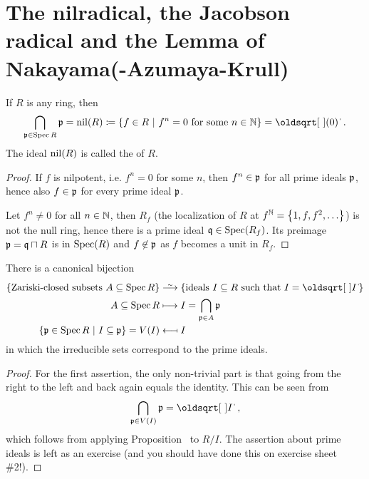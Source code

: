 \documentclass[a4paper,parskip=half,numbers=enddot, DIV=12]{scrreprt}
\begin{document}
\section{The nilradical, the Jacobson radical and the Lemma of Nakayama(-Azumaya-Krull)}

\begin{prop}
    If $R$ is any ring, then 
    \begin{align*}
    	\bigcap_{\pp\in\Spec R} \pp =\nil(R) \coloneqq \left\{f\in R\st f^n=0 \text{ for some } n\in\IN\right\} = \sqrt{(0)}\;.
    \end{align*}
    The ideal $\operatorname{nil}(R)$ is called the  of $R$.
\end{prop}
\begin{proof}
    If $f$ is nilpotent, i.e. $f^n=0$ for some $n$, then $f^n\in\mathfrak{p}$ for all prime ideals $\mathfrak{p}$, hence also $f\in\mathfrak{p}$ for every prime ideal $\mathfrak{p}$. 
    
    Let $f^n\neq 0$ for all $n\in \mathbb{N}$, then $R_f$ (the localization of $R$ at $f^{\mathbb{N}}=\left\{1,f,f^2,\ldots\right\}$) is not the null ring, hence there is a prime ideal $\mathfrak{q}\in\operatorname{Spec}(R_f)$. Its preimage $\mathfrak{p}=\mathfrak{q}\sqcap R$ is in $\operatorname{Spec}(R)$ and $f\not \in\mathfrak{p}$ as $f$ becomes a unit in $R_f$.
\end{proof}
\begin{cor}
    There is a canonical bijection 
    \begin{align*}
	    \left\{\text{Zariski-closed subsets }A\subseteq \Spec R\right\}&\isomorphism \left\{\text{ideals }I\subseteq R\text{ such that }I=\sqrt{I}\right\}\\
        A \subseteq \Spec R &\longmapsto I = \bigcap_{\pp\in A} \pp\\
        \left\{\pp\in \Spec R\st I\subseteq \pp\right\}=V(I)&\longmapsfrom I
    \end{align*}
    in which the irreducible sets correspond to the prime ideals.
\end{cor}
\begin{proof}
    For the first assertion, the only non-trivial part is that going from the right to the left and back again equals the identity. This can be seen from 
    \begin{align}\lbl{eq:PrimeCapRadical}
        \bigcap_{\pp\in V(I)}\pp = \sqrt{I}\;,
    \end{align}
    which follows from applying Proposition~ to $R/I$. The assertion about prime ideals is left as an exercise (and you should have done this on exercise sheet \#2!).
\end{proof}
\end{document}
